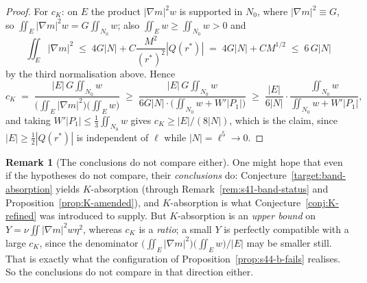 \documentclass[11pt]{article}
\theoremstyle{definition}
\newtheorem{remark}[theorem]{Remark}
\theoremstyle{remark}
\begin{document}
\begin{proof}
  For $c_K$: on $E$ the product $|\nabla m|^2w$ is supported in $N_0$, where
  $|\nabla m|^2\equiv G$, so $\iint_E|\nabla m|^2w = G\iint_{N_0} w$; also
  $\iint_E w \ge \iint_{N_0} w>0$ and
  \[
    \iint_E|\nabla m|^2 \;\leq\; 4G|N| + C\frac{M^2}{(r^*)^2}|Q(r^*)|
    \;=\;4G|N| + C M^{1/2}
    \;\leq\; 6\,G|N|
  \]
  by the third normalisation above. Hence
  \[
    c_K \;=\;\frac{|E|\,G\iint_{N_0} w}
      {\bigl(\iint_E|\nabla m|^2\bigr)\bigl(\iint_E w\bigr)}
    \;\geq\;\frac{|E|\,G\iint_{N_0} w}
      {6 G|N|\cdot\bigl(\iint_{N_0}w+W'|P_1|\bigr)}
    \;\geq\;\frac{|E|}{6|N|}\cdot
      \frac{\iint_{N_0}w}{\iint_{N_0}w+W'|P_1|} ,
  \]
  and taking $W'|P_1|\leq\tfrac13\iint_{N_0} w$ gives
  $c_K\geq |E|/(8|N|)$, which is the claim, since
  $|E|\geq\tfrac12|Q(r^*)|$ is independent of $\ell$ while
  $|N|=\ell^5\to0$.
\end{proof}

\begin{remark}[The conclusions do not compare either]\label{rem:s44-conclusions}
  One might hope that even if the hypotheses do not compare, their
  \emph{conclusions} do: Conjecture~\ref{target:band-absorption} yields
  $K$-absorption (through Remark~\ref{rem:s41-band-status} and
  Proposition~\ref{prop:K-amended}), and $K$-absorption is what
  Conjecture~\ref{conj:K-refined} was introduced to supply. But $K$-absorption
  is an \emph{upper bound} on $Y=\nu\iint|\nabla m|^2w\eta^2$, whereas $c_K$ is
  a \emph{ratio}; a small $Y$ is perfectly compatible with a large $c_K$,
  since the denominator
  $\bigl(\iint_E|\nabla m|^2\bigr)\bigl(\iint_Ew\bigr)/|E|$ may be smaller
  still. That is exactly what the configuration of
  Proposition~\ref{prop:s44-b-fails} realises. So the conclusions do not
  compare in that direction either.
\end{remark}
\end{document}
